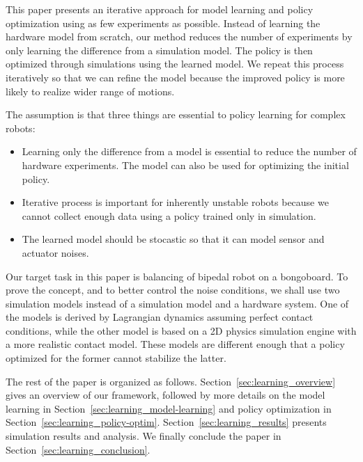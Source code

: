 This paper presents an iterative approach for model learning and
policy optimization using as few experiments as possible.
Instead of learning the hardware model from scratch, our method reduces
the number of experiments by only learning the difference from a
simulation model.
The policy is then optimized through simulations using the learned
model.
We repeat this process iteratively so that we can refine the model
because the improved policy is more likely to realize wider range of
motions.

The assumption is that three things are essential to policy learning for
complex robots:
\begin{itemize}
\item Learning only the difference from a model is essential to reduce
the number of hardware experiments.  The model can also be used 
	  for optimizing the initial policy.
\item Iterative process is important for inherently unstable robots because
	  we cannot collect enough data using a policy trained only in simulation.
\item The learned model should be stocastic so that it can model
	  sensor and actuator noises.
\end{itemize}

Our target task in this paper is balancing of bipedal robot on a
bongoboard.
To prove the concept, and to better control the noise conditions, we shall use
two simulation models instead of a simulation model and a hardware system.
One of the models is derived by Lagrangian dynamics assuming perfect
contact conditions, while the other model is based on a 2D physics
simulation engine with a more realistic contact model.
These models are different enough that a policy optimized
for the former cannot stabilize the latter.

The rest of the paper is organized as follows.
Section~\ref{sec:learning_overview} gives an overview of our framework, followed
by more details on the model learning in
Section~\ref{sec:learning_model-learning} and policy optimization in
Section~\ref{sec:learning_policy-optim}.
Section~\ref{sec:learning_results} presents simulation results and analysis.
We finally conclude the paper in Section~\ref{sec:learning_conclusion}.


